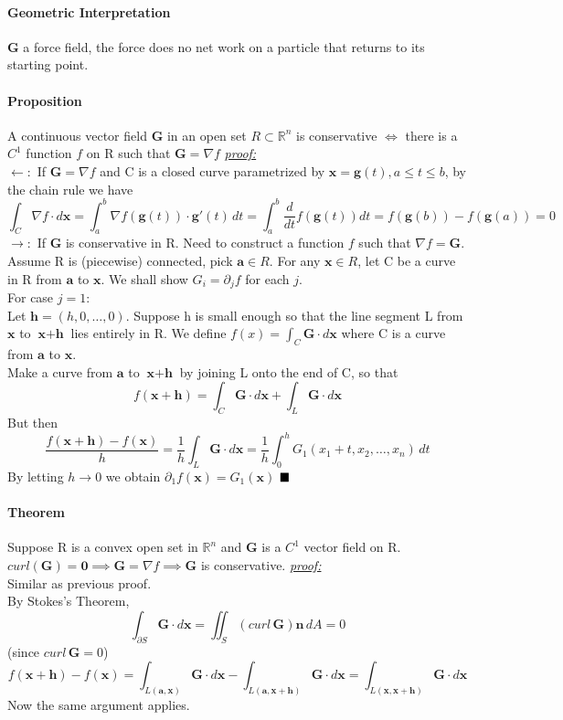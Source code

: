 \documentclass[11pt]{article}
\newcommand{\tb}[1]{\textbf{#1}}
\newcommand{\real}[0]{\mathbb{R}}
\newcommand{\proof}[0]{\textit{\underline{proof:} }}
\newcommand{\vx}[0]{\tb{x}}
\newcommand{\vo}[0]{\tb{0}}
\newcommand{\va}[0]{\tb{a}}
\newcommand{\vg}[0]{\tb{G}}
\newcommand{\vn}[0]{\tb{n}}
\newcommand{\qed}[0]{$\hfill\blacksquare$}
\begin{document}
\paragraph{Geometric Interpretation} $\vg$ a force field, the force does no net work on a particle that returns to its starting point.

\paragraph{Proposition} A continuous vector field $\vg$ in an open set $R \subset \real^n$ is conservative $\iff$ there is a $C^1$ function $f$ on R such that $\vg = \nabla f$
\proof \\
$\leftarrow:$ If $\vg = \nabla f$ and C is a closed curve parametrized by $\vx = \tb{g}(t), a\leq t\leq b$, by the chain rule we have 
$$\int_C \nabla f \cdot d\vx = \int_a^b \nabla f(\tb{g}(t))\cdot \tb{g}'(t)\,dt = \int_a^b \frac{d}{dt}f(\tb{g}(t))dt = f(\tb{g}(b)) - f(\tb{g}(a)) = 0$$
$\rightarrow:$ If $\vg$ is conservative in R. Need to construct a function $f$ such that $\nabla f = \vg$. Assume R is (piecewise) connected, pick $\va \in R$. For any $\vx \in R$, let C be a curve in R from $\va$ to $\vx$. We shall show $G_i = \partial_j f$ for each $j$.\\
For case $j = 1$: \\
Let $\tb{h} = (h, 0, \hdots, 0)$. Suppose h is small enough so that the line segment L from $\vx$ to $\vx + \tb{h}$ lies entirely in R. We define $f(x) = \int_C \vg \cdot d\vx$ where C is a curve from $\va$ to $\vx$. \\
Make a curve from $\va$ to $\vx + \tb{h}$ by joining L onto the end of C, so that $$f(\vx + \tb{h}) = \int_C \vg \cdot d\vx + \int_L \vg \cdot d\vx$$But then
$$\frac{f(\vx+\tb{h}) - f(\vx)}{h} = \frac{1}{h}\int_L \vg \cdot d\vx = \frac{1}{h} \int_0^h G_1(x_1+t,x_2,\hdots,x_n)\,dt$$
By letting $h \rightarrow 0$ we obtain $\partial_1 f(\vx) = G_1(\vx)$
\qed
\paragraph{Theorem} Suppose R is a convex open set in $\real^n$ and $\vg$ is a $C^1$ vector field on R. $curl(\vg) = \vo \implies \vg = \nabla f \implies \vg$ is conservative.
\proof \\
Similar as previous proof.\\
By Stokes's Theorem, $$\int_{\partial S}\vg \cdot d\vx = \iint_S(curl\, \vg)\vn \,dA = 0$$ (since $curl \,\vg = 0$)
$$f(\vx + \tb{h}) - f(\vx) = \int_{L(\va, \vx)}\vg\cdot d\vx - \int_{L(\va, \vx + \tb{h})} \vg \cdot d\vx = \int_{L(\vx,\vx+\tb{h})}\vg\cdot d\vx$$
Now the same argument applies.
\end{document}
